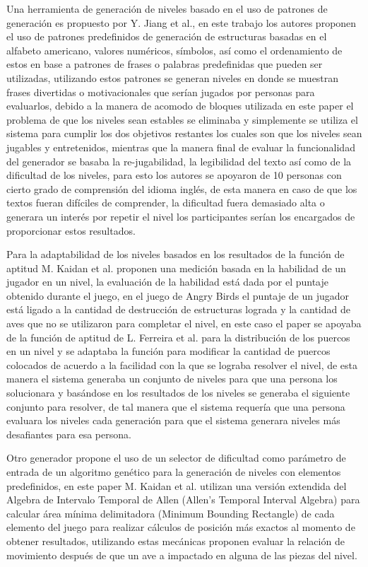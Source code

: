 Una herramienta de generación de niveles basado en el uso de patrones de
generación es propuesto por Y. Jiang et al.\cite{Jiang2017}, en este trabajo los
autores proponen el uso de patrones predefinidos de generación de estructuras
basadas en el alfabeto americano, valores numéricos, símbolos, así como el
ordenamiento de estos en base a patrones de frases o palabras predefinidas que
pueden ser utilizadas, utilizando estos patrones se generan niveles en donde se
muestran frases divertidas o motivacionales que serían jugados por personas para
evaluarlos, debido a la manera de acomodo de bloques utilizada en este paper el
problema de que los niveles sean estables se eliminaba y simplemente se utiliza
el sistema para cumplir los dos objetivos restantes los cuales son que los
niveles sean jugables y entretenidos, mientras que la manera final de evaluar la
funcionalidad del generador se basaba la re-jugabilidad, la legibilidad del texto
así como de la dificultad de los niveles, para esto los autores se apoyaron de
10 personas con cierto grado de comprensión del idioma inglés, de esta manera en
caso de que los textos fueran difíciles de comprender, la dificultad fuera
demasiado alta o generara un interés por repetir el nivel los participantes
serían los encargados de proporcionar estos resultados. %

Para la adaptabilidad de los niveles basados en los resultados de la función de
aptitud M. Kaidan et al.\cite{Kaidan2015} proponen una medición basada en la
habilidad de un jugador en un nivel, la evaluación de la habilidad está dada por
el puntaje obtenido durante el juego, en el juego de Angry Birds el puntaje de
un jugador está ligado a la cantidad de destrucción de estructuras lograda y la
cantidad de aves que no se utilizaron para completar el nivel, en este caso el
paper se apoyaba de la función de aptitud de L. Ferreira et
al.\cite{Ferreira2014} para la distribución de los puercos en un nivel y se
adaptaba la función para modificar la cantidad de puercos colocados de acuerdo a
la facilidad con la que se lograba resolver el nivel, de esta manera el sistema
generaba un conjunto de niveles para que una persona los solucionara y basándose
en los resultados de los niveles se generaba el siguiente conjunto para
resolver, de tal manera que el sistema requería que una persona evaluara los
niveles cada generación para que el sistema generara niveles más desafiantes
para esa persona.

Otro generador propone el uso de un selector de dificultad como parámetro de
entrada de un algoritmo genético para la generación de niveles con elementos
predefinidos, en este paper M. Kaidan et al.\cite{Kaidan2016} utilizan una
versión extendida del Algebra de Intervalo Temporal de Allen (Allen's Temporal
Interval Algebra)\cite{ALLEN1990} para calcular área mínima delimitadora
(Minimum Bounding Rectangle) de cada elemento del juego para realizar cálculos
de posición más exactos al momento de obtener resultados, utilizando estas
mecánicas proponen evaluar la relación de movimiento después de que un ave a
impactado en alguna de las piezas del nivel.

